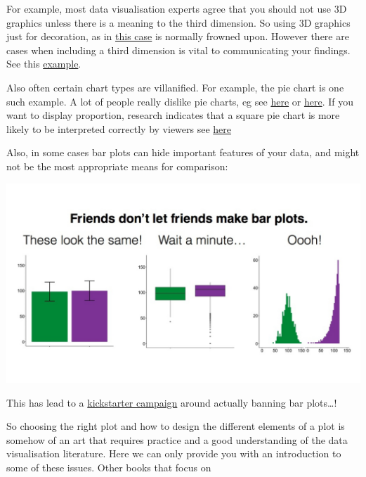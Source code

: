 \documentclass[]{book}
\theoremstyle{definition}
\theoremstyle{definition}
\theoremstyle{definition}
\theoremstyle{remark}
\begin{document}
For example, most data visualisation experts agree that you should not
use 3D graphics unless there is a meaning to the third dimension. So
using 3D graphics just for decoration, as in
\href{https://mir-s3-cdn-cf.behance.net/project_modules/disp/2505dd10837923.56030acd2ef20.jpg}{this
case} is normally frowned upon. However there are cases when including a
third dimension is vital to communicating your findings. See this
\href{http://www.visualisingdata.com/2015/03/when-3d-works/}{example}.

Also often certain chart types are villanified. For example, the pie
chart is one such example. A lot of people really dislike pie charts, eg
see
\href{http://www.storytellingwithdata.com/blog/2011/07/death-to-pie-charts}{here}
or
\href{http://www.businessinsider.com/pie-charts-are-the-worst-2013-6?IR=T}{here}.
If you want to display proportion, research indicates that a square pie
chart is more likely to be interpreted correctly by viewers see
\href{https://eagereyes.org/blog/2016/a-reanalysis-of-a-study-about-square-pie-charts-from-2009}{here}

Also, in some cases bar plots can hide important features of your data,
and might not be the most appropriate means for comparison:

\includegraphics{imgs/barbarplots.jpg}

This has lead to a
\href{https://www.kickstarter.com/projects/1474588473/barbarplots/description}{kickstarter
campaign} around actually banning bar plots\ldots{}!

So choosing the right plot and how to design the different elements of a
plot is somehow of an art that requires practice and a good
understanding of the data visualisation literature. Here we can only
provide you with an introduction to some of these issues. Other books
that focus on
\end{document}
